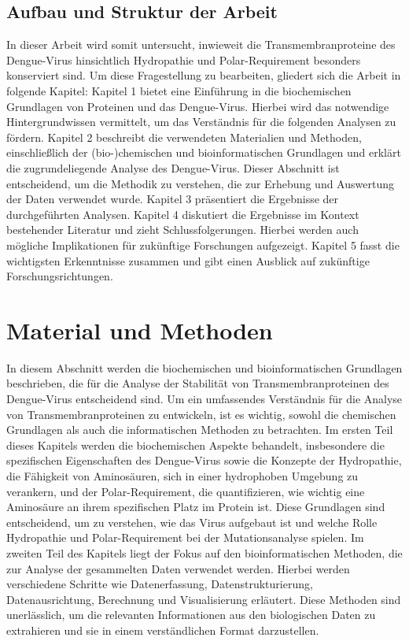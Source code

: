 \documentclass[german,version-2022-01]{uzl-thesis}
\begin{document}
\section{Aufbau und Struktur der Arbeit}
In dieser Arbeit wird somit untersucht, inwieweit die Transmembranproteine des Dengue-Virus hinsichtlich Hydropathie und Polar-Requirement besonders konserviert sind. Um diese Fragestellung zu bearbeiten, gliedert sich die Arbeit in folgende Kapitel: Kapitel 1 bietet eine Einf\"uhrung in die biochemischen Grundlagen von Proteinen und das Dengue-Virus. Hierbei wird das notwendige Hintergrundwissen vermittelt, um das Verst\"andnis f\"ur die folgenden Analysen zu f\"ordern. Kapitel 2 beschreibt die verwendeten Materialien und Methoden, einschlie\ss{}lich der (bio-)chemischen und bioinformatischen Grundlagen und erkl\"art die zugrundeliegende Analyse des Dengue-Virus. Dieser Abschnitt ist entscheidend, um die Methodik zu verstehen, die zur Erhebung und Auswertung der Daten verwendet wurde. Kapitel 3 pr\"asentiert die Ergebnisse der durchgef\"uhrten Analysen. Kapitel 4 diskutiert die Ergebnisse im Kontext bestehender Literatur und zieht Schlussfolgerungen. Hierbei werden auch m\"ogliche Implikationen f\"ur zuk\"unftige Forschungen aufgezeigt. Kapitel 5 fasst die wichtigsten Erkenntnisse zusammen und gibt einen Ausblick auf zuk\"unftige Forschungsrichtungen.

\chapter{Material und Methoden}%
\label{chapter-use}
In diesem Abschnitt werden die biochemischen und bioinformatischen Grundlagen beschrieben, die f\"ur die Analyse der Stabilit\"at von Transmembranproteinen des Dengue-Virus entscheidend sind. Um ein umfassendes Verst\"andnis f\"ur die Analyse von Transmembranproteinen zu entwickeln, ist es wichtig, sowohl die chemischen Grundlagen als auch die informatischen Methoden zu betrachten. Im ersten Teil dieses Kapitels werden die biochemischen Aspekte behandelt, insbesondere die spezifischen Eigenschaften des Dengue-Virus sowie die Konzepte der Hydropathie, die F\"ahigkeit von Aminos\"auren, sich in einer hydrophoben Umgebung zu verankern, und der Polar-Requirement, die quantifizieren, wie wichtig eine Aminos\"aure an ihrem spezifischen Platz im Protein ist. Diese Grundlagen sind entscheidend, um zu verstehen, wie das Virus aufgebaut ist und welche Rolle Hydropathie und Polar-Requirement bei der Mutationsanalyse spielen. Im zweiten Teil des Kapitels liegt der Fokus auf den bioinformatischen Methoden, die zur Analyse der gesammelten Daten verwendet werden. Hierbei werden verschiedene Schritte wie Datenerfassung, Datenstrukturierung, Datenausrichtung, Berechnung und Visualisierung erl\"autert. Diese Methoden sind unerl\"asslich, um die relevanten Informationen aus den biologischen Daten zu extrahieren und sie in einem verst\"andlichen Format darzustellen. 
\end{document}
